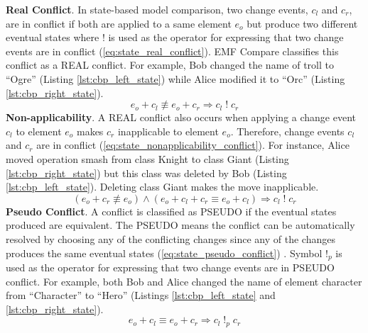 \textbf{Real Conflict}. In state-based model comparison, two change events, $c_{l}$ and $c_{r}$, are in conflict if both are applied to a same element $e_{o}$ but produce two different eventual states where $!$ is used as the operator for expressing that two change events are in conflict (\ref{eq:state_real_conflict}). EMF Compare \cite{emfcompare2018developer} classifies this conflict as a \textsf{REAL} conflict. For example, Bob changed the \textsf{name} of \textsf{troll} to ``Ogre'' (Listing \ref{lst:cbp_left_state}) while Alice modified it to ``Orc'' (Listing \ref{lst:cbp_right_state}). 
\begin{equation} \label{eq:state_real_conflict}
e_{o} + c_{l} \not\equiv e_{o} + c_{r} \Rightarrow c_{l}\;!\;c_{r}
\end{equation} 
\textbf{Non-applicability}. A \textsf{REAL} conflict also occurs when applying a change event $c_{l}$ to element $e_{o}$ makes $c_{r}$ inapplicable to element $e_{o}$. Therefore, change events $c_{l}$ and $c_{r}$ are in conflict (\ref{eq:state_nonapplicability_conflict}). 
For instance, Alice moved operation \textsf{smash} from class \textsf{Knight} to class \textsf{Giant} (Listing \ref{lst:cbp_right_state}) but this class was deleted by Bob (Listing \ref{lst:cbp_left_state}). Deleting class \textsf{Giant} makes the move inapplicable. 
\begin{equation} \label{eq:state_nonapplicability_conflict}
(e_{o} + c_{r} \not\equiv e_{o}) \wedge (e_{o} + c_{l} + c_{r} \equiv e_{o} + c_{l}) \Rightarrow c_{l}\;!\;c_{r}
\end{equation}
\textbf{Pseudo Conflict}. A conflict is classified as \textsf{PSEUDO} if the eventual states produced are equivalent. The \textsf{PSEUDO} means the conflict can be automatically resolved by choosing any of the conflicting changes since any of the changes produces the same eventual states (\ref{eq:state_pseudo_conflict}) \cite{emfcompare2018developer}. Symbol $!_{p}$ is used as the operator for expressing that two change events are in \textsf{PSEUDO} conflict. For example, both Bob and Alice changed the \textsf{name} of element \textsf{character} from ``Character'' to ``Hero'' (Listings \ref{lst:cbp_left_state} and \ref{lst:cbp_right_state}). 
\begin{equation} \label{eq:state_pseudo_conflict}
e_{o} + c_{l} \equiv e_{o} + c_{r} \Rightarrow c_{l}\;!_{p}\;c_{r}
\end{equation} 
